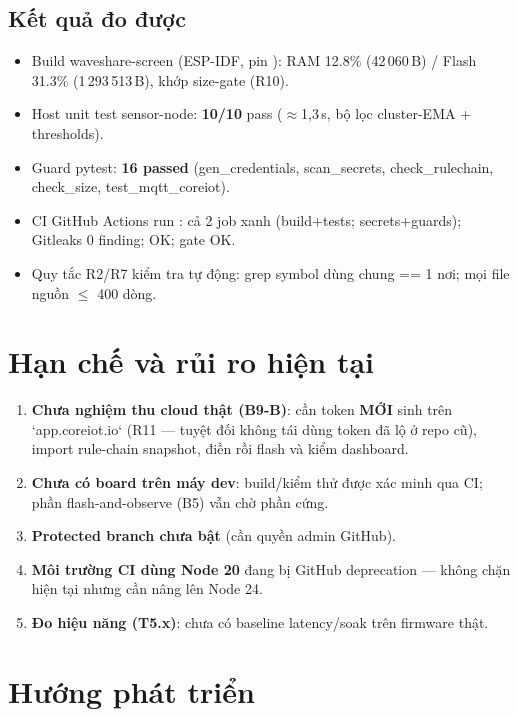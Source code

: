 \subsection{Kết quả đo được}
\begin{itemize}
\item Build waveshare-screen (ESP-IDF, pin ): RAM 12.8\%
  (42\,060\,B) / Flash 31.3\% (1\,293\,513\,B), khớp size-gate (R10).
\item Host unit test sensor-node: \textbf{10/10} pass ($\approx$1,3\,s, bộ lọc
  cluster-EMA + thresholds).
\item Guard pytest: \textbf{16 passed} (gen\_credentials, scan\_secrets,
  check\_rulechain, check\_size, test\_mqtt\_coreiot).
\item CI GitHub Actions run : cả 2 job xanh (build+tests;
  secrets+guards); Gitleaks 0 finding;  OK; gate
   OK.
\item Quy tắc R2/R7 kiểm tra tự động: grep symbol dùng chung == 1 nơi; mọi file
  nguồn $\leq$ 400 dòng.
\end{itemize}

\section{Hạn chế và rủi ro hiện tại}
\label{sec:pr-limits}

\begin{enumerate}
\item \textbf{Chưa nghiệm thu cloud thật (B9-B)}: cần token \textbf{MỚI} sinh trên
  `app.coreiot.io` (R11 — tuyệt đối không tái dùng token đã lộ ở repo cũ), import
  rule-chain snapshot, điền  rồi flash và kiểm dashboard.
\item \textbf{Chưa có board trên máy dev}: build/kiểm thử được xác minh qua CI; phần
  flash-and-observe (B5) vẫn chờ phần cứng.
\item \textbf{Protected branch  chưa bật} (cần quyền admin GitHub).
\item \textbf{Môi trường CI dùng Node 20} đang bị GitHub deprecation — không chặn hiện
  tại nhưng cần nâng lên Node 24.
\item \textbf{Đo hiệu năng (T5.x)}: chưa có baseline latency/soak trên firmware thật.
\end{enumerate}

\section{Hướng phát triển}
\label{sec:pr-future}

